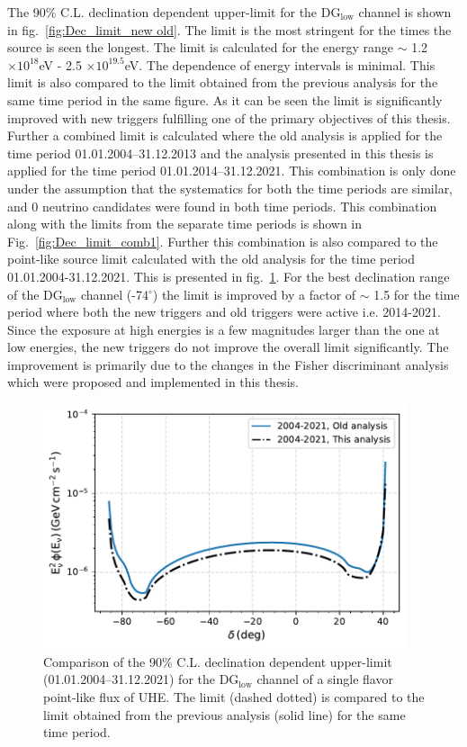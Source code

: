 The 90\% C.L. declination dependent upper-limit for the DG$_{\text{low}}$ channel is shown in fig.~\ref{fig:Dec_limit_new old}. The limit is the most stringent for the times the source is seen the longest. The limit is calculated for the energy range $\sim$ 1.2 $\times 10^{18}$eV - 2.5 $\times 10^{19.5}$eV. The dependence of energy intervals is minimal. This limit is also compared to the limit obtained from the previous analysis for the same time period in the same figure. As it can be seen the limit is significantly improved with new triggers fulfilling one of the primary objectives of this thesis. Further a combined limit is calculated where the old analysis is applied for the time period 01.01.2004–31.12.2013 and the analysis presented in this thesis is applied for the time period 01.01.2014–31.12.2021. This combination is only done under the assumption that the systematics for both the time periods are similar, and 0 neutrino candidates were found in both time periods. This combination along with the limits from the separate time periods is shown in Fig.~\ref{fig:Dec_limit_comb1}. Further this combination is also compared to the point-like source limit calculated with the old analysis for the time period 01.01.2004-31.12.2021. This is presented in fig.~\ref{fig:Dec_limit_comb2}. For the best declination range of the DG$_{\text{low}}$ channel (-74$^{\circ}$) the limit is improved by a factor of $\sim$ 1.5 for the time period where both the new triggers and old triggers were active i.e. 2014-2021. Since the exposure at high energies is a few magnitudes larger than the one at low energies, the new triggers do not improve the overall limit significantly. The improvement is primarily due to the changes in the Fisher discriminant analysis which were proposed and implemented in this thesis.


\begin{figure}[ht]
  \centering
  \includegraphics[width=0.95\textwidth]{thesis_figures/PointLimits/Point_comp_combined_2.pdf}
  \caption{Comparison of the 90\% C.L. declination dependent upper-limit (01.01.2004–31.12.2021) for the DG$_{\text{low}}$ channel of a single flavor point-like flux of UHE. The limit (dashed dotted) is compared to the limit obtained from the previous analysis (solid line) for the same time period.}
  \label{fig:Dec_limit_comb2}
\end{figure}


